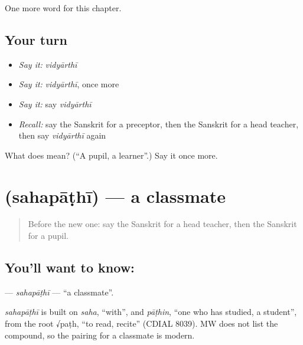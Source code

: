 \begin{grammarlens}[title={What you've built}]
One more word for this chapter.
\end{grammarlens}

\subsection*{Your turn}
\begin{itemize}
\raggedright
  \item \emph{Say it:} \emph{vidyārthī}
  \item \emph{Say it:} \emph{vidyārthī}, once more
  \item \emph{Say it:} say \emph{vidyārthī}
  \item \emph{Recall:} say the Sanskrit for a preceptor, then the Sanskrit for a head teacher, then say \emph{vidyārthī} again
\end{itemize}

\begin{tcolorbox}[breakable,colback=teal!4,colframe=teal!35!black,title={Before you move on}]
What does  mean? (\textquotedblleft{}A pupil, a learner\textquotedblright{}.) Say it once more.
\end{tcolorbox}
\section[\texorpdfstring{\sk{सहपाठी} (sahapāṭhī)}{सहपाठी (sahapāṭhī)}]{ (sahapāṭhī) — a classmate}

\label{lesson:SA-C210-sahapathi}



\begin{quote}
Before the new one: say the Sanskrit for a head teacher, then the Sanskrit for a pupil.
\end{quote}

\subsection*{You'll want to know: }
\textbf{} — \emph{sahapāṭhī} — \textquotedblleft{}a classmate\textquotedblright{}.

\begin{cousinweb}
\emph{sahapāṭhī} is built on \emph{saha}, \textquotedblleft{}with\textquotedblright{}, and \emph{pāṭhin}, \textquotedblleft{}one who has studied, a student\textquotedblright{}, from the root √paṭh, \textquotedblleft{}to read, recite\textquotedblright{} (CDIAL 8039). MW does not list the compound, so the pairing for a classmate is modern.
\end{cousinweb}

